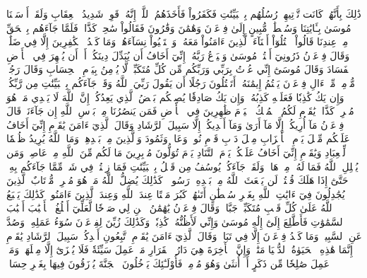 ذَٰلِكَ بِأَنَّهُمۡ كَانَت تَّأۡتِيهِمۡ رُسُلُهُم بِٱلۡبَيِّنَٰتِ فَكَفَرُواْ فَأَخَذَهُمُ ٱللَّهُۚ إِنَّهُۥ قَوِيّٞ شَدِيدُ ٱلۡعِقَابِ
وَلَقَدۡ أَرۡسَلۡنَا مُوسَىٰ بِـَٔايَٰتِنَا وَسُلۡطَٰنٖ مُّبِينٍ
إِلَىٰ فِرۡعَوۡنَ وَهَٰمَٰنَ وَقَٰرُونَ فَقَالُواْ سَٰحِرٞ كَذَّابٞ
فَلَمَّا جَآءَهُم بِٱلۡحَقِّ مِنۡ عِندِنَا قَالُواْ ٱقۡتُلُوٓاْ أَبۡنَآءَ ٱلَّذِينَ ءَامَنُواْ مَعَهُۥ وَٱسۡتَحۡيُواْ نِسَآءَهُمۡۚ وَمَا كَيۡدُ ٱلۡكَٰفِرِينَ إِلَّا فِي ضَلَٰلٖ
وَقَالَ فِرۡعَوۡنُ ذَرُونِيٓ أَقۡتُلۡ مُوسَىٰ وَلۡيَدۡعُ رَبَّهُۥٓۖ إِنِّيٓ أَخَافُ أَن يُبَدِّلَ دِينَكُمۡ أَوۡ أَن يُظۡهِرَ فِي ٱلۡأَرۡضِ ٱلۡفَسَادَ
وَقَالَ مُوسَىٰٓ إِنِّي عُذۡتُ بِرَبِّي وَرَبِّكُم مِّن كُلِّ مُتَكَبِّرٖ لَّا يُؤۡمِنُ بِيَوۡمِ ٱلۡحِسَابِ
وَقَالَ رَجُلٞ مُّؤۡمِنٞ مِّنۡ ءَالِ فِرۡعَوۡنَ يَكۡتُمُ إِيمَٰنَهُۥٓ أَتَقۡتُلُونَ رَجُلًا أَن يَقُولَ رَبِّيَ ٱللَّهُ وَقَدۡ جَآءَكُم بِٱلۡبَيِّنَٰتِ مِن رَّبِّكُمۡۖ وَإِن يَكُ كَٰذِبٗا فَعَلَيۡهِ كَذِبُهُۥۖ وَإِن يَكُ صَادِقٗا يُصِبۡكُم بَعۡضُ ٱلَّذِي يَعِدُكُمۡۖ إِنَّ ٱللَّهَ لَا يَهۡدِي مَنۡ هُوَ مُسۡرِفٞ كَذَّابٞ
يَٰقَوۡمِ لَكُمُ ٱلۡمُلۡكُ ٱلۡيَوۡمَ ظَٰهِرِينَ فِي ٱلۡأَرۡضِ فَمَن يَنصُرُنَا مِنۢ بَأۡسِ ٱللَّهِ إِن جَآءَنَاۚ قَالَ فِرۡعَوۡنُ مَآ أُرِيكُمۡ إِلَّا مَآ أَرَىٰ وَمَآ أَهۡدِيكُمۡ إِلَّا سَبِيلَ ٱلرَّشَادِ
وَقَالَ ٱلَّذِيٓ ءَامَنَ يَٰقَوۡمِ إِنِّيٓ أَخَافُ عَلَيۡكُم مِّثۡلَ يَوۡمِ ٱلۡأَحۡزَابِ
مِثۡلَ دَأۡبِ قَوۡمِ نُوحٖ وَعَادٖ وَثَمُودَ وَٱلَّذِينَ مِنۢ بَعۡدِهِمۡۚ وَمَا ٱللَّهُ يُرِيدُ ظُلۡمٗا لِّلۡعِبَادِ
وَيَٰقَوۡمِ إِنِّيٓ أَخَافُ عَلَيۡكُمۡ يَوۡمَ ٱلتَّنَادِ
يَوۡمَ تُوَلُّونَ مُدۡبِرِينَ مَا لَكُم مِّنَ ٱللَّهِ مِنۡ عَاصِمٖۗ وَمَن يُضۡلِلِ ٱللَّهُ فَمَا لَهُۥ مِنۡ هَادٖ
وَلَقَدۡ جَآءَكُمۡ يُوسُفُ مِن قَبۡلُ بِٱلۡبَيِّنَٰتِ فَمَا زِلۡتُمۡ فِي شَكّٖ مِّمَّا جَآءَكُم بِهِۦۖ حَتَّىٰٓ إِذَا هَلَكَ قُلۡتُمۡ لَن يَبۡعَثَ ٱللَّهُ مِنۢ بَعۡدِهِۦ رَسُولٗاۚ كَذَٰلِكَ يُضِلُّ ٱللَّهُ مَنۡ هُوَ مُسۡرِفٞ مُّرۡتَابٌ
ٱلَّذِينَ يُجَٰدِلُونَ فِيٓ ءَايَٰتِ ٱللَّهِ بِغَيۡرِ سُلۡطَٰنٍ أَتَىٰهُمۡۖ كَبُرَ مَقۡتًا عِندَ ٱللَّهِ وَعِندَ ٱلَّذِينَ ءَامَنُواْۚ كَذَٰلِكَ يَطۡبَعُ ٱللَّهُ عَلَىٰ كُلِّ قَلۡبِ مُتَكَبِّرٖ جَبَّارٖ
وَقَالَ فِرۡعَوۡنُ يَٰهَٰمَٰنُ ٱبۡنِ لِي صَرۡحٗا لَّعَلِّيٓ أَبۡلُغُ ٱلۡأَسۡبَٰبَ
أَسۡبَٰبَ ٱلسَّمَٰوَٰتِ فَأَطَّلِعَ إِلَىٰٓ إِلَٰهِ مُوسَىٰ وَإِنِّي لَأَظُنُّهُۥ كَٰذِبٗاۚ وَكَذَٰلِكَ زُيِّنَ لِفِرۡعَوۡنَ سُوٓءُ عَمَلِهِۦ وَصُدَّ عَنِ ٱلسَّبِيلِۚ وَمَا كَيۡدُ فِرۡعَوۡنَ إِلَّا فِي تَبَابٖ
وَقَالَ ٱلَّذِيٓ ءَامَنَ يَٰقَوۡمِ ٱتَّبِعُونِ أَهۡدِكُمۡ سَبِيلَ ٱلرَّشَادِ
يَٰقَوۡمِ إِنَّمَا هَٰذِهِ ٱلۡحَيَوٰةُ ٱلدُّنۡيَا مَتَٰعٞ وَإِنَّ ٱلۡأٓخِرَةَ هِيَ دَارُ ٱلۡقَرَارِ
مَنۡ عَمِلَ سَيِّئَةٗ فَلَا يُجۡزَىٰٓ إِلَّا مِثۡلَهَاۖ وَمَنۡ عَمِلَ صَٰلِحٗا مِّن ذَكَرٍ أَوۡ أُنثَىٰ وَهُوَ مُؤۡمِنٞ فَأُوْلَـٰٓئِكَ يَدۡخُلُونَ ٱلۡجَنَّةَ يُرۡزَقُونَ فِيهَا بِغَيۡرِ حِسَابٖ
